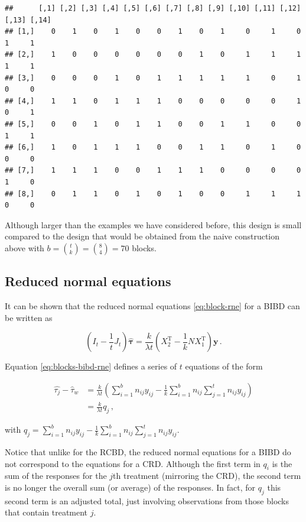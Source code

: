 \documentclass[
]{book}
\theoremstyle{definition}
\theoremstyle{definition}
\theoremstyle{definition}
\theoremstyle{definition}
\theoremstyle{remark}
\begin{document}
\begin{verbatim}
##      [,1] [,2] [,3] [,4] [,5] [,6] [,7] [,8] [,9] [,10] [,11] [,12] [,13] [,14]
## [1,]    0    1    0    1    0    0    1    0    1     0     1     0     1     1
## [2,]    1    0    0    0    0    0    0    1    0     1     1     1     1     1
## [3,]    0    0    0    1    0    1    1    1    1     1     0     1     0     0
## [4,]    1    1    0    1    1    1    0    0    0     0     0     1     0     1
## [5,]    0    0    1    0    1    1    0    0    1     1     0     0     1     1
## [6,]    1    0    1    1    1    0    0    1    1     0     1     0     0     0
## [7,]    1    1    1    0    0    1    1    1    0     0     0     0     1     0
## [8,]    0    1    1    0    1    0    1    0    0     1     1     1     0     0
\end{verbatim}

Although larger than the examples we have considered before, this design is small compared to the design that would be obtained from the naive construction above with \(b = {t \choose k} = {8 \choose 4} = 70\) blocks.

\hypertarget{reduced-normal-equations}{%
\subsection{Reduced normal equations}\label{reduced-normal-equations}}

It can be shown that the reduced normal equations \eqref{eq:block-rne} for a BIBD can be written as

\begin{equation}
\left(I_t - \frac{1}{t}J_t\right)\hat{\boldsymbol{\tau}} = \frac{k}{\lambda t}\left(X_2^{\mathrm{T}} - \frac{1}{k}NX_1^{\mathrm{T}}\right)\boldsymbol{y}\,.
\label{eq:blocks-bibd-rne}
\end{equation}

Equation \eqref{eq:blocks-bibd-rne} defines a series of \(t\) equations of the form

\begin{align*}
\hat{\tau_j} - \hat{\tau}_w & = \frac{k}{\lambda t}\left(\sum_{i = 1}^b n_{ij}y_{ij} - \frac{1}{k}\sum_{i=1}^bn_{ij}\sum_{j=1}^tn_{ij}y_{ij}\right) \\
& = \frac{k}{\lambda t} q_j\,,
\end{align*}

with \(q_j = \sum_{i = 1}^b n_{ij}y_{ij} - \frac{1}{k}\sum_{i=1}^bn_{ij}\sum_{j=1}^tn_{ij}y_{ij}\).

Notice that unlike for the RCBD, the reduced normal equations for a BIBD do not correspond to the equations for a CRD. Although the first term in \(q_i\) is the sum of the responses for the \(j\)th treatment (mirroring the CRD), the second term is no longer the overall sum (or average) of the responses. In fact, for \(q_j\) this second term is an adjusted total, just involving observations from those blocks that contain treatment \(j\).
\end{document}

